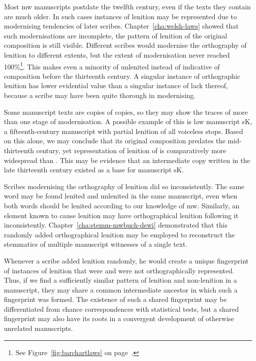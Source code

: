 Most \gls{mw} manuscripts postdate the twelfth century, even if the texts they contain are much older. In such cases instances of lenition may be represented due to modernising tendencies of later scribes. Chapter~\ref{cha:welsh-laws} showed  that such modernisations are incomplete, \ie the pattern of lenition of the original composition is still visible. Different scribes would modernise the orthography of lenition to different extents, but the extent of modernisation never reached 100\%\footnote{See \eg Figure~\ref{fig:barchartlaws} on page~\pageref{fig:barchartlaws}.}. This makes even a minority of unlenited  instead of  indicative of composition before the thirteenth century. A singular instance of orthographic lenition has lower evidential value than a singular instance of lack thereof, because a scribe may have been quite thorough in modernising.

Some manuscript texts are copies of copies, so they may show the traces of more than one stage of modernisation. A possible example of this is law manuscript \gls{sK}, a fifteenth-century manuscript with partial lenition of all voiceless stops. Based on this alone, we may conclude that its original composition predates the mid-thirteenth century, yet representation of lenition of  is comparatively more widespread than . This may be evidence that an intermediate copy written in the late thirteenth century existed as a base for manuscript \gls{sK}.

Scribes modernising the orthography of lenition did so inconsistently. The same word may be found lenited and unlenited in the same manuscript, even when both words should be lenited according to our knowledge of \gls{mw}. Similarly, an element known to cause lenition may have orthographical lenition following it inconsistently. Chapter~\ref{cha:stemm-mwbuch-dewi} demonstrated that this randomly added orthographical lenition may be employed to reconstruct the stemmatics of multiple manuscript witnesses of a single text.

Whenever a scribe added lenition randomly, he would create a unique fingerprint of instances of lenition that were and were not orthographically represented. Thus, if we find a sufficiently similar pattern of lenition and non-lenition in a manuscript, they may share a common intermediate ancestor in which such a fingerprint was formed. The existence of such a shared fingerprint may be differentiated from chance correspondences with statistical tests, but a shared fingerprint may also have its roots in a convergent development of otherwise unrelated manuscripts.

